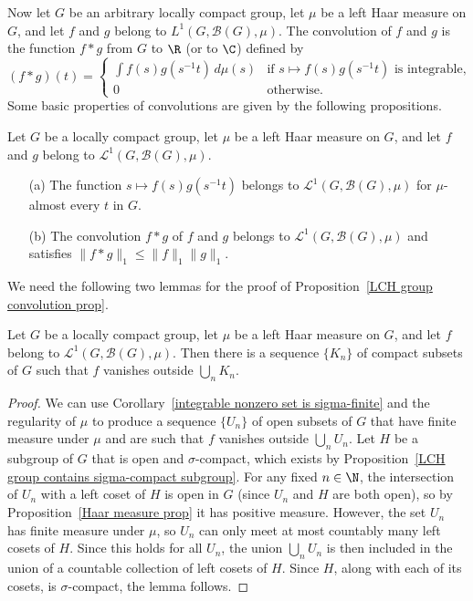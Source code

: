 Now let $G$ be an arbitrary locally compact group, let $\mu$ be a left Haar measure on $G$, and let $f$ and $g$ belong to $L^1(G,\mathcal{B}(G),\mu)$. The convolution of $f$ and $g$ is the function $f\ast g$ from $G$ to $\R$ (or to $\C$) defined by
\[(f\ast g)(t)=\begin{cases}
\int f(s)g(s^{-1}t)\,d\mu(s)&\text{if $s\mapsto f(s)g(s^{-1}t)$ is integrable},\\
0&\text{otherwise}.
\end{cases}\]
Some basic properties of convolutions are given by the following propositions.
\begin{proposition}\label{LCH group convolution prop}
Let $G$ be a locally compact group, let $\mu$ be a left Haar measure on $G$, and let $f$ and $g$ belong to $\mathcal{L}^1(G,\mathcal{B}(G),\mu)$.
\begin{itemize}
\item[(a)] The function $s\mapsto f(s)g(s^{-1}t)$ belongs to $\mathcal{L}^1(G,\mathcal{B}(G),\mu)$ for $\mu$-almost every $t$ in $G$.
\item[(b)] The convolution $f\ast g$ of $f$ and $g$ belongs to $\mathcal{L}^1(G,\mathcal{B}(G),\mu)$ and satisfies $\|f\ast g\|_1\leq\|f\|_1\|g\|_1$.
\end{itemize}
\end{proposition}
We need the following two lemmas for the proof of Proposition~\ref{LCH group convolution prop}.
\begin{lemma}\label{LCH group integrable function vanish outside sigma-compact}
Let $G$ be a locally compact group, let $\mu$ be a left Haar measure on $G$, and let $f$ belong to $\mathcal{L}^1(G,\mathcal{B}(G),\mu)$. Then there is a sequence $\{K_n\}$ of compact subsets of $G$ such that $f$ vanishes outside $\bigcup_nK_n$.
\end{lemma}
\begin{proof}
We can use Corollary~\ref{integrable nonzero set is sigma-finite} and the regularity of $\mu$ to produce a sequence $\{U_n\}$ of open subsets of $G$ that have finite measure under $\mu$ and are such that $f$ vanishes outside $\bigcup_nU_n$. Let $H$ be a subgroup of $G$ that is open and $\sigma$-compact, which exists by Proposition~\ref{LCH group contains sigma-compact subgroup}. For any fixed $n\in\N$, the intersection of $U_n$ with a left coset of $H$ is open in $G$ (since $U_n$ and $H$ are both open), so by Proposition~\ref{Haar measure prop} it has positive measure. However, the set $U_n$ has finite measure under $\mu$, so $U_n$ can only meet at most countably many left cosets of $H$. Since this holds for all $U_n$, the union $\bigcup_nU_n$ is then included in the union of a countable collection of left cosets of $H$. Since $H$, along with each of its cosets, is $\sigma$-compact, the lemma follows.
\end{proof}
